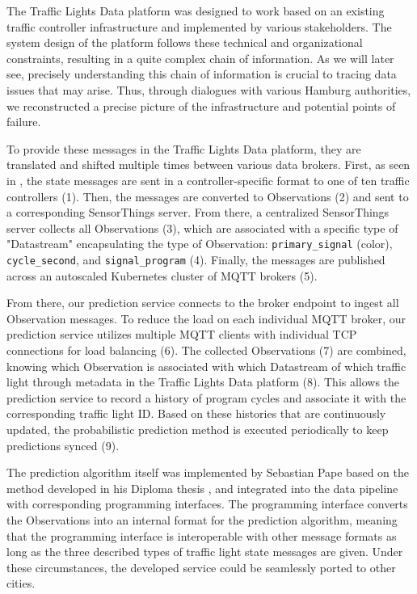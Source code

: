 The Traffic Lights Data platform was designed to work based on an existing traffic controller infrastructure and implemented by various stakeholders. The system design of the platform follows these technical and organizational constraints, resulting in a quite complex chain of information. As we will later see, precisely understanding this chain of information is crucial to tracing data issues that may arise. Thus, through dialogues with various Hamburg authorities, we reconstructed a precise picture of the infrastructure and potential points of failure.

To provide these messages in the Traffic Lights Data platform, they are translated and shifted multiple times between various data brokers. First, as seen in , the state messages are sent in a controller-specific format to one of ten traffic controllers (1). Then, the messages are converted to Observations (2) and sent to a corresponding SensorThings server. From there, a centralized SensorThings server collects all Observations (3), which are associated with a specific type of "Datastream" encapsulating the type of Observation: \texttt{primary\_signal} (color), \texttt{cycle\_second}, and \texttt{signal\_program} (4). Finally, the messages are published across an autoscaled Kubernetes cluster of MQTT brokers (5). 

From there, our prediction service connects to the broker endpoint to ingest all Observation messages. To reduce the load on each individual MQTT broker, our prediction service utilizes multiple MQTT clients with individual TCP connections for load balancing (6). The collected Observations (7) are combined, knowing which Observation is associated with which Datastream of which traffic light through metadata in the Traffic Lights Data platform (8). This allows the prediction service to record a history of program cycles and associate it with the corresponding traffic light ID. Based on these histories that are continuously updated, the probabilistic prediction method is executed periodically to keep predictions synced (9). 

The prediction algorithm itself was implemented by Sebastian Pape based on the method developed in his Diploma thesis \cite{pape_untersuchung_2012}, and integrated into the data pipeline with corresponding programming interfaces. The programming interface converts the Observations into an internal format for the prediction algorithm, meaning that the programming interface is interoperable with other message formats as long as the three described types of traffic light state messages are given. Under these circumstances, the developed service could be seamlessly ported to other cities.


